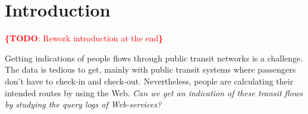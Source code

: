 \documentclass{sig-alternate}
\newcommand{\todo}[1]{\noindent\textcolor{red}{{\bf \{TODO}: #1{\bf \}}}}
\begin{document}
\vspace{1em}

\section{Introduction}
\label{sec:introduction}

\todo{Rework introduction at the end}




%

Getting indications of people flows through public transit networks is a challenge.
The data is tedious to get, mainly with public transit systems where passengers don't have to check-in and check-out.
Nevertheless, people are calculating their intended routes by using the Web.
\emph{Can we get an indication of these transit flows by studying the query logs of Web-services?}
\end{document}
